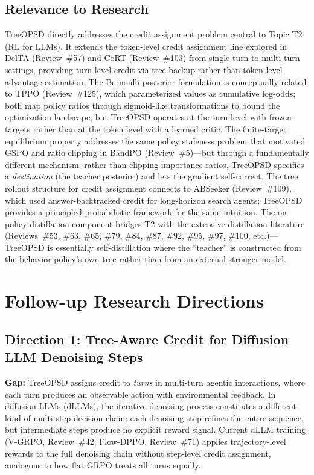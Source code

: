 \documentclass[11pt,a4paper]{article}
\begin{document}
\subsection{Relevance to Research}
TreeOPSD directly addresses the credit assignment problem central to Topic T2 (RL for LLMs). It extends the token-level credit assignment line explored in DelTA (Review~\#57) and CoRT (Review~\#103) from single-turn to multi-turn settings, providing turn-level credit via tree backup rather than token-level advantage estimation. The Bernoulli posterior formulation is conceptually related to TPPO (Review~\#125), which parameterized values as cumulative log-odds; both map policy ratios through sigmoid-like transformations to bound the optimization landscape, but TreeOPSD operates at the turn level with frozen targets rather than at the token level with a learned critic. The finite-target equilibrium property addresses the same policy staleness problem that motivated GSPO and ratio clipping in BandPO (Review~\#5)---but through a fundamentally different mechanism: rather than clipping importance ratios, TreeOPSD specifies a \emph{destination} (the teacher posterior) and lets the gradient self-correct. The tree rollout structure for credit assignment connects to ABSeeker (Review~\#109), which used answer-backtracked credit for long-horizon search agents; TreeOPSD provides a principled probabilistic framework for the same intuition. The on-policy distillation component bridges T2 with the extensive distillation literature (Reviews~\#53, \#63, \#65, \#79, \#84, \#87, \#92, \#95, \#97, \#100, etc.)---TreeOPSD is essentially self-distillation where the ``teacher'' is constructed from the behavior policy's own tree rather than from an external stronger model.

\section{Follow-up Research Directions}

\subsection{Direction 1: Tree-Aware Credit for Diffusion LLM Denoising Steps}
\textbf{Gap:} TreeOPSD assigns credit to \emph{turns} in multi-turn agentic interactions, where each turn produces an observable action with environmental feedback. In diffusion LLMs (dLLMs), the iterative denoising process constitutes a different kind of multi-step decision chain: each denoising step refines the entire sequence, but intermediate steps produce no explicit reward signal. Current dLLM training (V-GRPO, Review~\#42; Flow-DPPO, Review~\#71) applies trajectory-level rewards to the full denoising chain without step-level credit assignment, analogous to how flat GRPO treats all turns equally.
\end{document}
